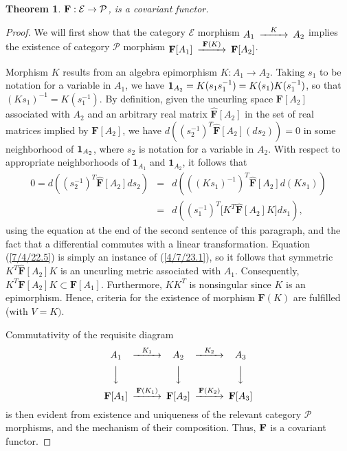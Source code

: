 \documentclass{amsart}
\numberwithin{equation}{section}
\newtheorem{theorem}{Theorem}
\theoremstyle{definition}
\numberwithin{theorem}{section}
\begin{document}
\begin{theorem}\label{6/13/22.1}  ${\bf F}: \mathcal{E}\rightarrow \mathcal{P}$, is a covariant functor. 
 \end{theorem}
 \begin{proof}
We will first show that the category $\mathcal{E}$ morphism $ \begin{CD}  A_1 @>K>> A_2\end{CD}$ implies the existence of category $\mathcal{P}$ morphism $ \begin{CD}  {\bf F}[A_1] @>{\bf F}(K)>> {\bf F}[A_2]\end{CD}$.

Morphism $K$ results from an algebra epimorphism $K:A_1\rightarrow A_2$.   Taking $s_1$ to be notation for a variable in $A_1$, we have ${\bf 1}_{A_2} = K(s_1s_1^{-1}) = K(s_1)K(s_1^{-1})$, so that $(Ks_1)^{-1} = K(s_1^{-1})$.  By definition, given the uncurling space $\mathbf{F}[A_2]$ associated with $A_2$ and an arbitrary real matrix  $\hat{\mathbf{F}}[A_2]$ in the set of real matrices implied by $\mathbf{F}[A_2]$, we have $d\left((s_2^{-1})^T\hat{\mathbf{F}}[A_2] (ds_2)\right) = 0$ in some neighborhood of ${\bf 1}_{A_2}$, where $s_2$ is notation for a variable in $A_2$.   With respect to appropriate neighborhoods of $\mathbf{1}_{A_1}$ and $\mathbf{1}_{A_2}$, it follows that \begin{eqnarray}\nonumber 0 = d\left((s_2^{-1})^T\hat{\mathbf{F}}[A_2] ds_2\right) &=&  d\left(((Ks_1)^{-1})^T\hat{\mathbf{F}}[A_2] d(Ks_1)\right) \\  &=& d\left((s_1^{-1})^T \big[K^T \hat{\mathbf{F}}[A_2]K\big]ds_1\right), \label{7/4/22.5}  \end{eqnarray}   using the equation at the end of the second sentence of this paragraph, and the fact that a differential commutes with a linear transformation.  Equation (\ref{7/4/22.5}) is simply an instance of (\ref{4/7/23.1}), so it follows that symmetric $K^T \hat{\mathbf{F}}[A_2]K$ is an uncurling metric associated with $A_1$.  Consequently, $K^T\mathbf{F}[A_2]K\subset \mathbf{F}[A_1]$.  Furthermore, $KK^T$ is nonsingular since $K$ is an epimorphism.  Hence, criteria for the existence of morphism $\mathbf{F}(K)$ are fulfilled (with $V=K)$.

Commutativity of the requisite diagram
  \[  \begin{CD}  
A_1 @>K_1>> A_2 @>K_2>> A_3\\
 @VVV   @VVV  @VVV\\
 {\bf F}[A_1]   @>{\bf F}(K_1)>>  {\bf F}[A_2]  @>{\bf F}(K_2)>>  {\bf F}[A_3] \\ 
 \end{CD} \]
is then evident from existence and uniqueness of the relevant category $\mathcal{P}$ morphisms, and the mechanism of their composition.  Thus, ${\bf F}$ is a covariant functor. 
\end{proof}
\end{document}
